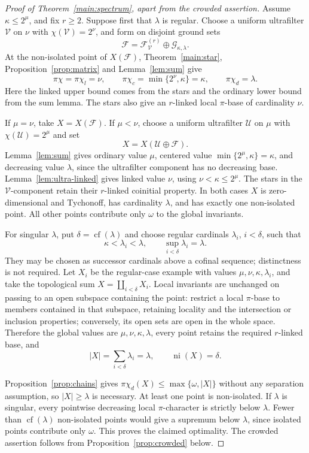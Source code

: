 \documentclass[10pt,a4paper]{amsart}
\theoremstyle{definition}
\theoremstyle{remark}
\newcommand{\U}{\mathcal U}
\newcommand{\F}{\mathcal F}
\newcommand{\G}{\mathcal G}
\newcommand{\pc}{\pi\chi}
\newcommand{\pcl}{\pi\chi_l}
\newcommand{\pcc}{\pi\chi_c}
\newcommand{\pcd}{\pi\chi_d}
\DeclareMathOperator{\cf}{cf}
\DeclareMathOperator{\niso}{ni}
\begin{document}
\begin{proof}[Proof of Theorem~\ref{main:spectrum}, apart from the crowded assertion]
Assume $\kappa\leqslant2^\mu$, and fix $r\geqslant2$. Suppose first that $\lambda$ is regular. Choose a uniform ultrafilter $\mathcal V$ on $\nu$ with $\chi(\mathcal V)=2^\nu$, and form on disjoint ground sets
\[
\F=\F_{\mathcal V}^{(r)}\oplus\G_{\kappa,\lambda}.
\]
At the non-isolated point of $X(\F)$, Theorem~\ref{main:star}, Proposition~\ref{prop:matrix} and Lemma~\ref{lem:sum} give
\[
\pc=\pcl=\nu,\qquad\pcc=\min\{2^\nu,\kappa\}=\kappa,
\qquad\pcd=\lambda.
\]
Here the linked upper bound comes from the stars and the ordinary lower bound from the sum lemma. The stars also give an $r$-linked local $\pi$-base of cardinality $\nu$.

If $\mu=\nu$, take $X=X(\F)$. If $\mu<\nu$, choose a uniform ultrafilter $\U$ on $\mu$ with $\chi(\U)=2^\mu$ and set
\[
X=X(\U\oplus\F).
\]
Lemma~\ref{lem:sum} gives ordinary value $\mu$, centered value $\min\{2^\mu,\kappa\}=\kappa$, and decreasing value $\lambda$, since the ultrafilter component has no decreasing base. Lemma~\ref{lem:ultra-linked} gives linked value $\nu$, using $\nu<\kappa\leqslant2^\mu$. The stars in the $\mathcal V$-component retain their $r$-linked coinitial property. In both cases $X$ is zero-dimensional and Tychonoff, has cardinality $\lambda$, and has exactly one non-isolated point. All other points contribute only $\omega$ to the global invariants.

For singular $\lambda$, put $\delta=\cf(\lambda)$ and choose regular cardinals $\lambda_i$, $i<\delta$, such that
\[
\kappa<\lambda_i<\lambda,\qquad\sup_{i<\delta}\lambda_i=\lambda.
\]
They may be chosen as successor cardinals above a cofinal sequence; distinctness is not required. Let $X_i$ be the regular-case example with values $\mu,\nu,\kappa,\lambda_i$, and take the topological sum $X=\coprod_{i<\delta}X_i$. Local invariants are unchanged on passing to an open subspace containing the point: restrict a local $\pi$-base to members contained in that subspace, retaining locality and the intersection or inclusion properties; conversely, its open sets are open in the whole space. Therefore the global values are $\mu,\nu,\kappa,\lambda$, every point retains the required $r$-linked base, and
\[
|X|=\sum_{i<\delta}\lambda_i=\lambda,\qquad\niso(X)=\delta.
\]

Proposition~\ref{prop:chains} gives $\pcd(X)\leqslant\max\{\omega,|X|\}$ without any separation assumption, so $|X|\geqslant\lambda$ is necessary. At least one point is non-isolated. If $\lambda$ is singular, every pointwise decreasing local $\pi$-character is strictly below $\lambda$. Fewer than $\cf(\lambda)$ non-isolated points would give a supremum below $\lambda$, since isolated points contribute only $\omega$. This proves the claimed optimality. The crowded assertion follows from Proposition~\ref{prop:crowded} below.
\end{proof}
\end{document}
